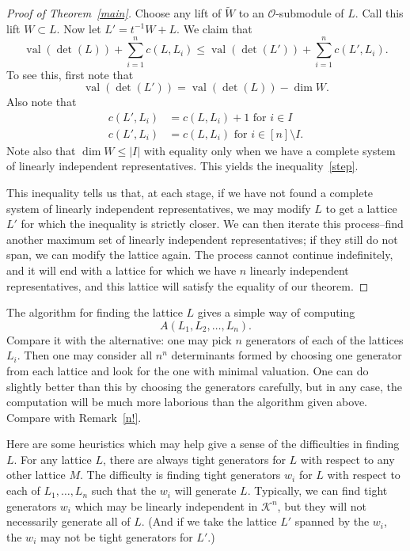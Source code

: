 \documentclass[ALCO,ThmDefs,Unicode,epreuves]{cedram}
\newcommand{\cO}{\mathcal{O}}
\newcommand{\cK}{\mathcal{K}}
\newcommand{\val}{\operatorname{val}}
\begin{document}
\begin{proof}[Proof of Theorem~\ref{main}]
Choose any lift of $\tilde{W}$ to an $\cO$-submodule of $L$. Call this lift $W \subset L$. Now let $L' = t^{-1}W + L$. We claim that
\begin{equation} \label{step}
\val(\det(L)) + \sum_{i=1}^n c(L,L_i) \leq \val(\det(L')) + \sum_{i=1}^n c(L',L_i) .
\end{equation}
To see this, first note that 
\[
\val(\det(L')) = \val(\det(L)) - \dim W.
\]
Also note that 
\begin{align*}
c(L',L_i) &= c(L,L_i) + 1 \text{ for } i \in I
\\
c(L',L_i) &= c(L,L_i) \text{ for } i \in [n] \setminus I.
\end{align*}
Note also that $\dim W \leq |I|$ with equality only when we have a complete system of linearly independent representatives. This yields the inequality~\eqref{step}.

This inequality tells us that, at each stage, if we have not found a complete system of linearly independent representatives, we may modify $L$ to get a lattice $L'$ for which the inequality is strictly closer. We can then iterate this process--find another maximum set of linearly independent representatives; if they still do not span, we can modify the lattice again. The process cannot continue indefinitely, and it will end with a lattice for which we have $n$ linearly independent representatives, and this lattice will satisfy the equality of our theorem.
\end{proof}

\begin{rema} \label{n^n} The algorithm for finding the lattice $L$ gives a simple way of computing 
\[
A(L_1, L_2, \dots, L_n).
\] 
Compare it with the alternative: one may pick $n$ generators of each of the lattices $L_i$. Then one may consider all $n^n$ determinants formed by choosing one generator from each lattice and look for the one with minimal valuation. One can do slightly better than this by choosing the generators carefully, but in any case, the computation will be much more laborious than the algorithm given above. Compare with Remark~\ref{n!}.
\end{rema}

\begin{rema} Here are some heuristics which may help give a sense of the difficulties in finding $L$. For any lattice $L$, there are always tight generators for $L$ with respect to any other lattice $M$. The difficulty is finding tight generators $w_i$ for $L$ with respect to each of $L_1, \dots, L_n$ such that the $w_i$ will generate $L$. Typically, we can find tight generators $w_i$ which may be linearly independent in $\cK^n$, but they will not necessarily generate all of $L$. (And if we take the lattice $L'$ spanned by the $w_i$, the $w_i$ may not be tight generators for $L'$.)
\end{rema}
\end{document}
